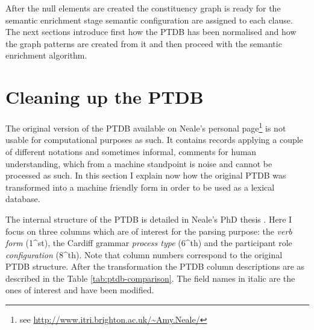 After the null elements are created the constituency graph is ready for the semantic enrichment stage semantic configuration are assigned to each clause. The next sections introduce first how the PTDB has been normalised and how the graph patterns are created from it and then proceed with the semantic enrichment algorithm.

\section{Cleaning up the PTDB}
\label{sec:claning-ptdb}

The original version of the PTDB available on Neale's personal page\footnote{see \url{http://www.itri.brighton.ac.uk/~Amy.Neale/}} is not usable for computational purposes as such. It  contains records applying a couple of different notations and sometimes informal, comments for human understanding, which from a machine standpoint is noise and cannot be processed as such. In this section I explain now how the original PTDB was transformed into a machine friendly form in order to be used as a lexical database.

The internal structure of the PTDB is detailed in Neale's PhD thesis \citep[193--231]{Neale2002}. Here I focus on three columns which are of interest for the parsing purpose: the \textit{verb form} (1^{st}), the Cardiff grammar \textit{process type} (6^{th}) and the participant role \textit{configuration} (8^{th}). Note that column numbers correspond to the original PTDB structure. After the transformation the PTDB column descriptions are as described in the Table \ref{tab:ptdb-comparison}. The field names in italic are the ones of interest and have been modified.


